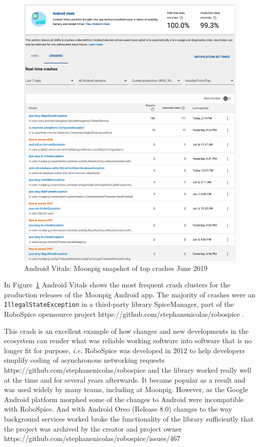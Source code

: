 \begin{figure}
    \centering
    \includegraphics[width=13cm]{images/android-vitals-screenshots/moonpig/real-time-crashes-Screenshot-2019-06-10-at-15.42.34.png}
    \caption{Android Vitals: Moonpig snapshot of top crashes  June 2019}
    \label{fig:av-moonpig-top-real-time-crashes-10-jun-2019}
\end{figure}

In Figure~\ref{fig:av-moonpig-top-real-time-crashes-10-jun-2019} Android Vitals shows the most frequent crash clusters for the production releases of the Moonpig Android app. The majority of crashes were an \texttt{IllegalStateException} in a third-party library SpiceManager, part of the RoboSpice opensource project https://github.com/stephanenicolas/robospice . 

This crash is an excellent example of how changes and new developments in the ecosystem can render what was reliable working software into software that is no longer fit for purpose, \emph{i.e.} RoboSpice was developed in 2012 to help developers simplify coding of asynchronous networking requests https://github.com/stephanenicolas/robospice and the library worked really well at the time and for several years afterwards. It became popular as a result and was used widely by many teams, including at Moonpig. However, as the Google Android platform morphed some of the changes to Android were incompatible with RoboSpice. And with Android Oreo (Release 8.0) changes to the way background services worked broke the functionality of the library sufficiently that the project was archived by the creator and project owner https://github.com/stephanenicolas/robospice/issues/467 


